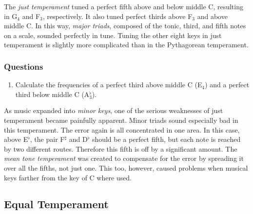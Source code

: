 \documentclass[11pt]{NSF}
\def\ben{\begin{enumerate}}
\def\een{\end{enumerate}}
\begin{document}
The {\em just temperament} tuned a perfect fifth above and below middle C,
resulting in G$_4$ and F$_3$, respectively. 
It also tuned perfect thirds above F$_3$ and above middle C. 
In this way, {\em major triads}, composed of the tonic, third, and 
fifth notes on a scale, sounded perfectly in tune. 
Tuning the other eight keys in just temperament is slightly more
complicated than in the Pythagorean temperament.

\subsubsection*{Questions}
\ben
\item
Calculate the frequencies of a perfect third above middle C (E$_4$) 
and a perfect third below middle C (A$^\flat_3$).
\een

As music expanded into {\em minor keys}, one of the serious weaknesses of
just temperament became painfully apparent. Minor triads sound
especially bad in this temperament. The error again is all
concentrated in one area. In this case, above E$^\flat$, 
the pair F$^\sharp$ and D$^\flat$
should be a perfect fifth, but each note is reached by two different
routes. Therefore this fifth is off by a significant amount. The 
{\em mean tone temperament} was created to compensate for the error by
spreading it over all the fifths, not just one. This too, however, caused
problems when musical keys farther from the key of C where used.

\subsection{Equal Temperament}
\end{document}
